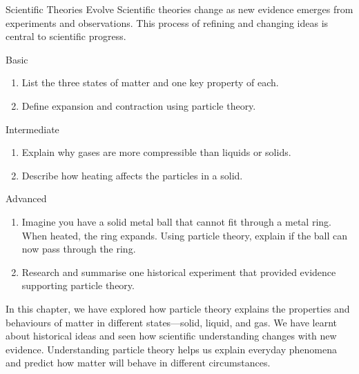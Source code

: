 
\begin{keyconcept}{Scientific Theories Evolve}
Scientific theories change as new evidence emerges from experiments and observations. This process of refining and changing ideas is central to scientific progress.
\end{keyconcept}

\FloatBarrier

\begin{tieredquestions}{Basic}
\begin{enumerate}
    \item List the three states of matter and one key property of each.
    \item Define expansion and contraction using particle theory.
\end{enumerate}
\end{tieredquestions}

\begin{tieredquestions}{Intermediate}
\begin{enumerate}
    \item Explain why gases are more compressible than liquids or solids.
    \item Describe how heating affects the particles in a solid.
\end{enumerate}
\end{tieredquestions}

\begin{tieredquestions}{Advanced}
\begin{enumerate}
    \item Imagine you have a solid metal ball that cannot fit through a metal ring. When heated, the ring expands. Using particle theory, explain if the ball can now pass through the ring.
    \item Research and summarise one historical experiment that provided evidence supporting particle theory.
\end{enumerate}
\end{tieredquestions}

\FloatBarrier

In this chapter, we have explored how particle theory explains the properties and behaviours of matter in different states—solid, liquid, and gas. We have learnt about historical ideas and seen how scientific understanding changes with new evidence. Understanding particle theory helps us explain everyday phenomena and predict how matter will behave in different circumstances.
\FloatBarrier

